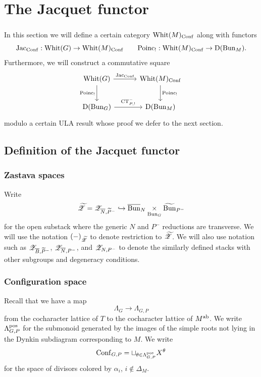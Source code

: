 \section{The Jacquet functor}
\label{section:Jacquet}

\subsubsection{} In this section we will define a certain category $\mathrm{Whit}(M)_{\mathrm{Conf}}$ along with functors
  \[\mathrm{Jac}_{\mathrm{Conf}} : \mathrm{Whit}(G) \to \mathrm{Whit}(M)_{\mathrm{Conf}}  \qquad  \mathrm{Poinc}_! : \mathrm{Whit}(M)_{\mathrm{Conf}} \to \mathrm{D}(\mathrm{Bun}_M).\]
Furthermore, we will construct a commutative square
\begin{equation}
\label{eqn:Jac_Conf_Poinc_compatibility}
\begin{tikzcd}[
  column sep={9em,between origins},
  row sep={4em,between origins}
]
  \Whit(G) \arrow[d, "\Poinc_!" left] \arrow[r, "\Jac_\Conf"] & \Whit(M)_\Conf \arrow[d, "\Poinc_!"] \\
  \DMod(\Bun_G) \arrow[r, "\CT_{P,!}^-"] & \DMod(\Bun_M) 
\end{tikzcd}
\end{equation}
modulo a certain ULA result whose proof we defer to the next section.

\subsection{Definition of the Jacquet functor}

\subsubsection{Zastava spaces} Write
\[
    {\widetilde{\mathscr{Z}}} = \mathscr{Z}_{\overline{N},\widetilde{P}^-} \hookrightarrow \overline{\mathrm{Bun}}_N \underset{\mathrm{Bun}_G}{\times} \widetilde{\mathrm{Bun}}_{P^-}
\]
for the open substack where the generic $N$ and $P^-$ reductions are transverse. We will use the notation $(-)_{\widetilde{\mathscr{Z}}}$ to denote restriction to ${\widetilde{\mathscr{Z}}}$. We will also use notation such as $\mathscr{Z}_{\overline{B}, \widetilde{P}^-}$, $\mathscr{Z}_{\overline{N}, P^-}$, and $\mathscr{Z}_{N, P^-}$ to denote the similarly defined stacks with other subgroups and degeneracy conditions.

\subsubsection{Configuration space} Recall that we have a map
  \[\Lambda_G \to \Lambda_{G,P}\]
from the cocharacter lattice of $T$ to the cocharacter lattice of $M^{\mathrm{ab}}$. We write $\Lambda_{G,P}^{\mathrm{pos}}$ for the submonoid generated by the images of the simple roots not lying in the Dynkin subdiagram corresponding to $M$. We write
  \[\mathrm{Conf}_{G,P} = \sqcup_{\theta \in \Lambda_{G,P}^{\mathrm{pos}}} X^\theta\]
for the space of divisors colored by $\alpha_i$, $i \notin \Delta_M$.

